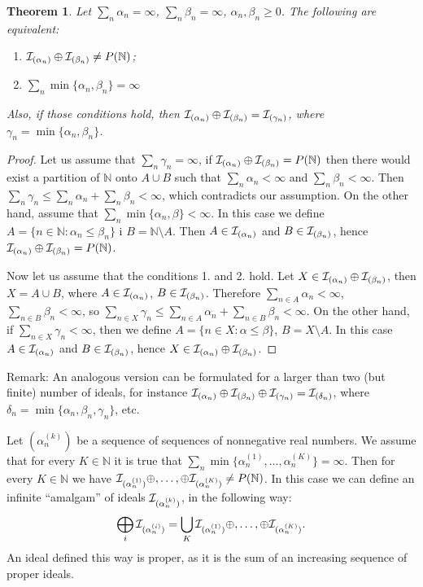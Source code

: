 \documentclass[12pt]{article}
\theoremstyle{plain}
\newtheorem{theorem}{Theorem}[section]
\theoremstyle{definition}
\theoremstyle{remark}
\newcommand{\nnatural}{\mathbb{N}}
\newcommand{\cI}{{\cal I}}
\begin{document}
\begin{theorem}
Let $\sum_n \alpha_n = \infty$, $\sum_n \beta_n = \infty$,
$\alpha_n, \beta_n \geq 0$. The following are equivalent:
\begin{enumerate}
\item
  $\cI_{(\alpha_n)} \oplus \cI_{(\beta_n)} \not = P(\nnatural)$;
\item
  $\sum_n \min\{\alpha_n,\beta_n\} = \infty$
\end{enumerate}
Also, if those conditions hold, then $\cI_{(\alpha_n)} \oplus \cI_{(\beta_n)} = \cI_{(\gamma_n)}$,
where $\gamma_n = \min\{\alpha_n,\beta_n\}$.
\end{theorem}
\begin{proof}
Let us assume that $\sum_n \gamma_n = \infty$, if 
$\cI_{(\alpha_n)} \oplus \cI_{(\beta_n)} = P(\nnatural)$ then there would exist a partition of $\nnatural$ onto $A \cup B$ such that 
$\sum_n \alpha_n < \infty$ and $\sum_n \beta_n < \infty$.
Then $\sum_n \gamma_n \leq \sum_n \alpha_n + \sum_n \beta_n < \infty$,
which contradicts our assumption.
On the other hand, assume that $\sum_n \min\{\alpha_n,\beta\} < \infty$. In this case we define $A = \{n \in \nnatural \colon \alpha_n \leq \beta_n\}$
i $B = \nnatural \setminus A$. Then 
$A \in \cI_{(\alpha_n)}$ and $B \in \cI_{(\beta_n)}$, hence 
$\cI_{(\alpha_n)} \oplus \cI_{(\beta_n)} = P(\nnatural)$.
  
Now let us assume that the conditions 1. and 2. hold. Let $X \in \cI_{(\alpha_n)} \oplus \cI_{(\beta_n)}$, then
$X = A \cup B$, where $A \in \cI_{(\alpha_n)}$,
$B \in \cI_{(\beta_n)}$. Therefore $\sum_{n\in A} \alpha_n < \infty$, 
$\sum_{n\in B} \beta_n < \infty$, so 
$\sum_{n\in X} \gamma_n \leq \sum_{n\in A} \alpha_n + \sum_{n\in B} \beta_n < \infty$.
On the other hand, if $\sum_{n\in X} \gamma_n < \infty$, then we define $A = \{n\in X\colon \alpha \leq \beta \}$,
$B = X \setminus A$. In this case $A \in \cI_{(\alpha_n)}$ and
$B \in \cI_{(\beta_n)}$, hence
$X\in\cI_{(\alpha_n)} \oplus \cI_{(\beta_n)}$.
\end{proof}

Remark: An analogous version can be formulated for a larger than two (but finite) number of ideals, for instance $\cI_{(\alpha_n)} \oplus \cI_{(\beta_n)} \oplus \cI_{(\gamma_n)} = \cI_{(\delta_n)}$, where $\delta_n = \min\{\alpha_n,\beta_n, \gamma_n\}$, etc.

Let $(\alpha_n^{(k)})$ be a sequence of sequences of nonnegative real numbers. We assume that for every $K \in \nnatural$ it is true that $\sum_n \min \{\alpha_n^{(1)}, \ldots, \alpha_n^{(K)}\} = \infty$. Then for every $K \in \nnatural$ we have
$\cI_{(\alpha_n^{(1)})} \oplus,\ldots,\oplus \cI_{(\alpha_n^{(K)})} \not= P(\nnatural)$.
In this case we can define an infinite ``amalgam'' of ideals $\cI_{(\alpha_n^{(k)})}$, in the following way:			 
$$\bigoplus_{i}\cI_{(\alpha_n^{(i)})} = \bigcup_{K} \cI_{(\alpha_n^{(1)})} \oplus,\ldots,\oplus \cI_{(\alpha_n^{(K)})}.$$
An ideal defined this way is proper, as it is the sum of an increasing sequence of proper ideals.
\end{document}
